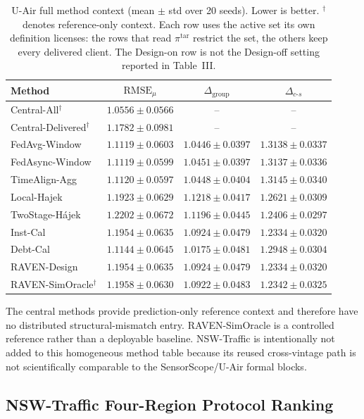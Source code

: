 \begin{table}[t]
\centering
\caption{U-Air full method context (mean $\pm$ std over 20 seeds).
Lower is better.  $^\dagger$ denotes reference-only context.
Each row uses the active set its own definition licenses: the rows that read
$\pi^{\mathrm{tar}}$ restrict the set, the others keep every delivered client.
The Design-on row is not the Design-off setting reported in Table~III.}
\label{tab:app_e3_uair}
\scriptsize
\setlength{\tabcolsep}{3pt}
\begin{tabular*}{\textwidth}{@{\extracolsep{\fill}}lccc}
\toprule
Method & $\mathrm{RMSE}_{\mu}$ & $\Delta_{\mathrm{group}}$ & $\Delta_{c\text{-}s}$\\
\midrule
Central-All$^{\dagger}$ & $1.0556\pm0.0566$ & -- & -- \\
Central-Delivered$^{\dagger}$ & $1.1782\pm0.0981$ & -- & -- \\
FedAvg-Window & $1.1119\pm0.0603$ & $1.0446\pm0.0397$ & $1.3138\pm0.0337$ \\
FedAsync-Window & $1.1119\pm0.0599$ & $1.0451\pm0.0397$ & $1.3137\pm0.0336$ \\
TimeAlign-Agg & $1.1120\pm0.0597$ & $1.0448\pm0.0404$ & $1.3145\pm0.0340$ \\
Local-Hajek & $1.1923\pm0.0629$ & $1.1218\pm0.0417$ & $1.2621\pm0.0309$ \\
TwoStage-H\'ajek & $1.2202\pm0.0672$ & $1.1196\pm0.0445$ & $1.2406\pm0.0297$ \\
Inst-Cal & $1.1954\pm0.0635$ & $1.0924\pm0.0479$ & $1.2334\pm0.0320$ \\
Debt-Cal & $1.1144\pm0.0645$ & $1.0175\pm0.0481$ & $1.2948\pm0.0304$ \\
RAVEN-Design & $1.1954\pm0.0635$ & $1.0924\pm0.0479$ & $1.2334\pm0.0320$ \\
RAVEN-SimOracle$^{\dagger}$ & $1.1958\pm0.0630$ & $1.0922\pm0.0483$ & $1.2342\pm0.0325$ \\
\bottomrule
\end{tabular*}
\end{table}

The central methods provide prediction-only reference context and therefore
have no distributed structural-mismatch entry.  RAVEN-SimOracle is a controlled
reference rather than a deployable baseline.  NSW-Traffic is intentionally not
added to this homogeneous method table because its reused cross-vintage path is not
scientifically comparable to the SensorScope/U-Air formal blocks.

\subsection{NSW-Traffic Four-Region Protocol Ranking}
\label{app:traffic_four_region}

